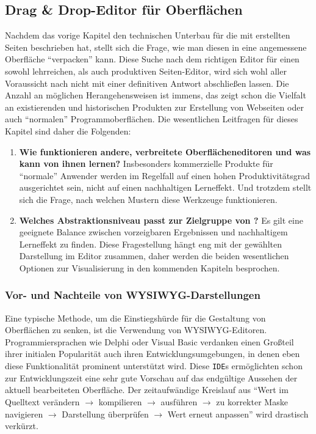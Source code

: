 \subsection{Drag \& Drop-Editor für Oberflächen}
\label{sec:drag-drop-ui-editor}

Nachdem das vorige Kapitel den technischen Unterbau für die mit \idename{} erstellten Seiten beschrieben hat, stellt sich die Frage, wie man diesen in eine angemessene Oberfläche "`verpacken"' kann. Diese Suche nach dem richtigen Editor für einen sowohl lehrreichen, als auch produktiven Seiten-Editor, wird sich wohl aller Voraussicht nach nicht mit einer definitiven Antwort abschließen lassen. Die Anzahl an möglichen Herangehensweisen ist immens, das zeigt schon die Vielfalt an existierenden und historischen Produkten zur Erstellung von Webseiten oder auch "`normalen"' Programmoberflächen. Die wesentlichen Leitfragen für dieses Kapitel sind daher die Folgenden:

\begin{enumerate}[noitemsep]
\item \textbf{Wie funktionieren andere, verbreitete Oberflächeneditoren und was kann \idename{} von ihnen lernen?} Insbesonders kommerzielle Produkte für "`normale"' Anwender werden im Regelfall auf einen hohen Produktivitätsgrad ausgerichtet sein, nicht auf einen nachhaltigen Lerneffekt. Und trotzdem stellt sich die Frage, nach welchen Mustern diese Werkzeuge funktionieren.
\item \textbf{Welches Abstraktionsniveau passt zur Zielgruppe von \idename{}?} Es gilt eine geeignete Balance zwischen vorzeigbaren Ergebnissen und nachhaltigem Lerneffekt zu finden. Diese Fragestellung hängt eng mit der gewählten Darstellung im Editor zusammen, daher werden die beiden wesentlichen Optionen zur Visualisierung in den kommenden Kapiteln besprochen.
\end{enumerate}

\subsubsection{Vor- und Nachteile von WYSIWYG-Darstellungen}
\label{sec:pro-con-wysiwyg-editor}

Eine typische Methode, um die Einstiegshürde für die Gestaltung von Oberflächen zu senken, ist die Verwendung von WYSIWYG-Editoren. Programmiersprachen wie Delphi oder Visual Basic verdanken einen Großteil ihrer initialen Popularität auch ihren Entwicklungsumgebungen, in denen eben diese Funktionalität prominent unterstützt wird. Diese \texttt{IDE}s ermöglichten schon zur Entwicklungszeit eine sehr gute Vorschau auf das endgültige Aussehen der aktuell bearbeiteten Oberfläche. Der zeitaufwändige Kreislauf aus "`Wert im Quelltext verändern $\rightarrow$  kompilieren $\rightarrow$ ausführen $\rightarrow$ zu korrekter Maske navigieren $\rightarrow$ Darstellung überprüfen $\rightarrow$ Wert erneut anpassen"' wird drastisch verkürzt.

